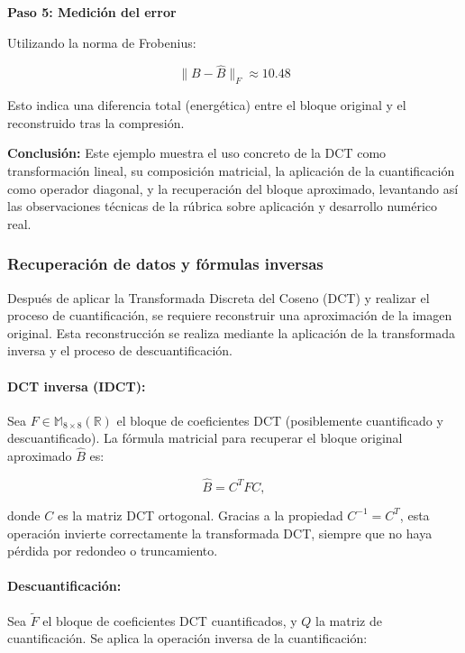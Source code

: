 \documentclass[8pt,a4paper]{article}
\theoremstyle{definition}
\theoremstyle{remark}
\begin{document}
\begin{multicols}{2}
            \textbf{Paso 5: Medición del error}
            
            Utilizando la norma de Frobenius:
            
            \[
            \|B - \hat{B}\|_F \approx 10.48
            \]
            
            Esto indica una diferencia total (energética) entre el bloque original y el reconstruido tras la compresión.
            
            \vspace{0.3cm}
            
            \textbf{Conclusión:} Este ejemplo muestra el uso concreto de la DCT como transformación lineal, su composición matricial, la aplicación de la cuantificación como operador diagonal, y la recuperación del bloque aproximado, levantando así las observaciones técnicas de la rúbrica sobre aplicación y desarrollo numérico real.

            \subsubsection{Recuperación de datos y fórmulas inversas}

            Después de aplicar la Transformada Discreta del Coseno (DCT) y realizar el proceso de cuantificación, se requiere reconstruir una aproximación de la imagen original. Esta reconstrucción se realiza mediante la aplicación de la transformada inversa y el proceso de descuantificación.
            
            \paragraph{DCT inversa (IDCT):} Sea \( F \in \mathbb{M}_{8 \times 8}(\mathbb{R}) \) el bloque de coeficientes DCT (posiblemente cuantificado y descuantificado). La fórmula matricial para recuperar el bloque original aproximado \( \hat{B} \) es:
            
            \[
            \hat{B} = C^T F C,
            \]
            
            donde \( C \) es la matriz DCT ortogonal. Gracias a la propiedad \( C^{-1} = C^T \), esta operación invierte correctamente la transformada DCT, siempre que no haya pérdida por redondeo o truncamiento.
            
            \paragraph{Descuantificación:} Sea \( \tilde{F} \) el bloque de coeficientes DCT cuantificados, y \( Q \) la matriz de cuantificación. Se aplica la operación inversa de la cuantificación:
            

\end{multicols}
\end{document}
